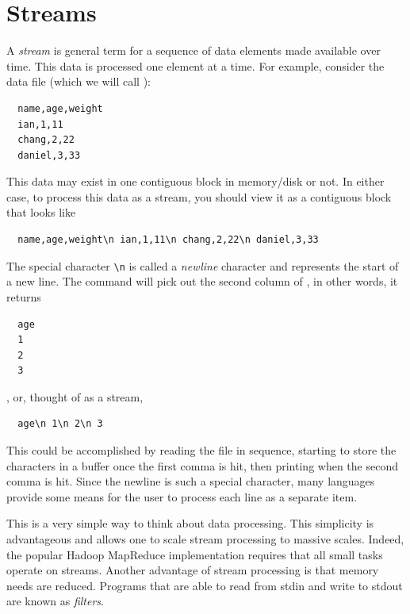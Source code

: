 \section{Streams}
A \emph{stream} is general term for a sequence of data elements made available over time.  This data is processed one element at a time.  For example, consider the data file (which we will call ):
\begin{verbatim}
  name,age,weight
  ian,1,11
  chang,2,22
  daniel,3,33
\end{verbatim}
This data may exist in one contiguous block in memory/disk or not.  In either case, to process this data as a stream, you should view it as a contiguous block that looks like
\begin{verbatim}
  name,age,weight\n ian,1,11\n chang,2,22\n daniel,3,33
\end{verbatim}
The special character \lstinline$\n$ is called a \emph{newline} character and represents the start of a new line.  The command  will pick out the second column of , in other words, it returns
\begin{verbatim}
  age
  1
  2
  3
\end{verbatim}
, or, thought of as a stream,
\begin{verbatim}
  age\n 1\n 2\n 3
\end{verbatim}
This could be accomplished by reading the file in sequence, starting to store the characters in a buffer once the first comma is hit, then printing when the second comma is hit.  Since the newline is such a special character, many languages provide some means for the user to process each line as a separate item.

This is a very simple way to think about data processing.  This simplicity is advantageous and allows one to scale stream processing to massive scales.  Indeed, the popular Hadoop MapReduce implementation requires that all small tasks operate on streams.  Another advantage of stream processing is that memory needs are reduced.  Programs that are able to read from stdin and write to stdout are known as \emph{filters}.

